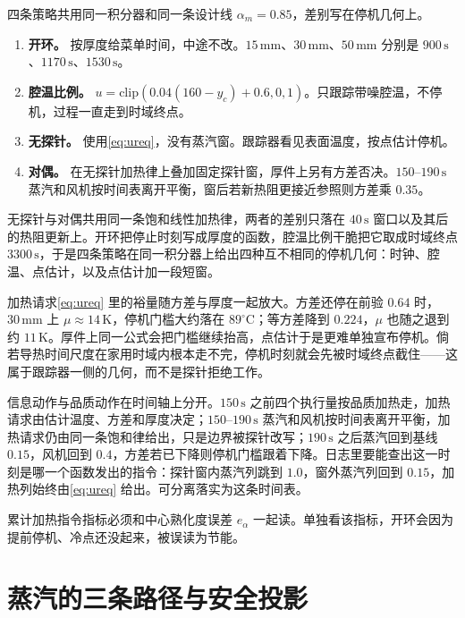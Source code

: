 四条策略共用同一积分器和同一条设计线 \(\alpha_m=0.85\)，差别写在停机几何上。
\begin{enumerate}
\item \textbf{开环。} 按厚度给菜单时间，中途不改。\(15\,\mathrm{mm}\)、\(30\,\mathrm{mm}\)、\(50\,\mathrm{mm}\) 分别是 \(900\,\mathrm{s}\)、\(1170\,\mathrm{s}\)、\(1530\,\mathrm{s}\)。
\item \textbf{腔温比例。} \(u=\mathrm{clip}(0.04(160-y_c)+0.6,0,1)\)。只跟踪带噪腔温，不停机，过程一直走到时域终点。
\item \textbf{无探针。} 使用\eqref{eq:ureq}，没有蒸汽窗。跟踪器看见表面温度，按点估计停机。
\item \textbf{对偶。} 在无探针加热律上叠加固定探针窗，厚件上另有方差否决。\(150\)--\(190\,\mathrm{s}\) 蒸汽和风机按时间表离开平衡，窗后若新热阻更接近参照则方差乘 \(0.35\)。
\end{enumerate}

无探针与对偶共用同一条饱和线性加热律，两者的差别只落在 \(40\,\mathrm{s}\) 窗口以及其后的热阻更新上。开环把停止时刻写成厚度的函数，腔温比例干脆把它取成时域终点 \(3300\,\mathrm{s}\)，于是四条策略在同一积分器上给出四种互不相同的停机几何：时钟、腔温、点估计，以及点估计加一段短窗。

加热请求\eqref{eq:ureq} 里的裕量随方差与厚度一起放大。方差还停在前验 \(0.64\) 时，\(30\,\mathrm{mm}\) 上 \(\mu\approx14\,\mathrm{K}\)，停机门槛大约落在 \(89^\circ\mathrm{C}\)；等方差降到 \(0.224\)，\(\mu\) 也随之退到约 \(11\,\mathrm{K}\)。厚件上同一公式会把门槛继续抬高，点估计于是更难单独宣布停机。倘若导热时间尺度在家用时域内根本走不完，停机时刻就会先被时域终点截住——这属于跟踪器一侧的几何，而不是探针拒绝工作。

信息动作与品质动作在时间轴上分开。\(150\,\mathrm{s}\) 之前四个执行量按品质加热走，加热请求由估计温度、方差和厚度决定；\(150\)--\(190\,\mathrm{s}\) 蒸汽和风机按时间表离开平衡，加热请求仍由同一条饱和律给出，只是边界被探针改写；\(190\,\mathrm{s}\) 之后蒸汽回到基线 \(0.15\)，风机回到 \(0.4\)，方差若已下降则停机门槛跟着下降。日志里要能查出这一时刻是哪一个函数发出的指令：探针窗内蒸汽列跳到 \(1.0\)，窗外蒸汽列回到 \(0.15\)，加热列始终由\eqref{eq:ureq} 给出。可分离落实为这条时间表。

累计加热指令指标必须和中心熟化度误差 \(e_{\alpha}\) 一起读。单独看该指标，开环会因为提前停机、冷点还没起来，被误读为节能。

\section{蒸汽的三条路径与安全投影}
\label{ch:safe}

